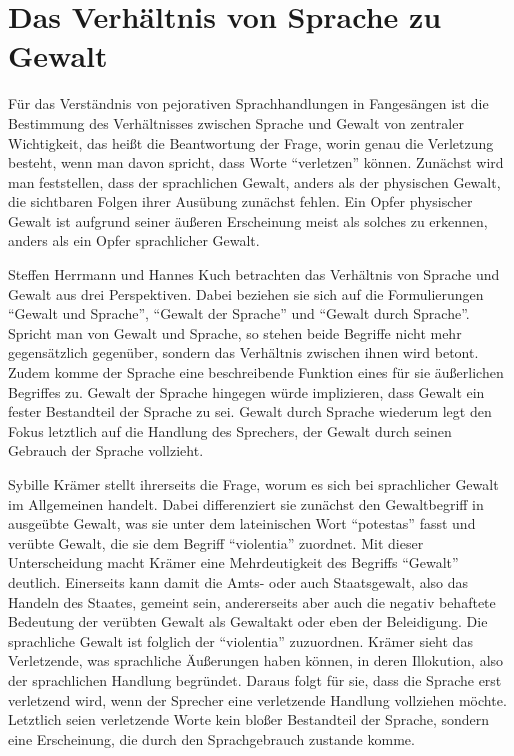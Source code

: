 \section{Das Verhältnis von Sprache zu Gewalt}
Für das Verständnis von pejorativen Sprachhandlungen in Fangesängen ist die Bestimmung des Verhältnisses zwischen Sprache und Gewalt von zentraler Wichtigkeit, das heißt die Beantwortung der Frage, worin genau die Verletzung besteht, wenn man davon spricht, dass Worte "`verletzen"' können.
Zunächst wird man feststellen, dass der sprachlichen Gewalt, anders als der physischen Gewalt, die sichtbaren Folgen ihrer Ausübung zunächst fehlen.
Ein Opfer physischer Gewalt ist aufgrund seiner äußeren Erscheinung meist als solches zu erkennen, anders als ein Opfer sprachlicher Gewalt.

Steffen Herrmann und Hannes Kuch betrachten das Verhältnis von Sprache und Gewalt aus drei Perspektiven\cite[S. 13]{SKH07}.
Dabei beziehen sie sich auf die Formulierungen "`Gewalt und Sprache"', "`Gewalt der Sprache"' und "`Gewalt durch Sprache"'.
Spricht man von Gewalt und Sprache, so stehen beide Begriffe nicht mehr gegensätzlich gegenüber, sondern das Verhältnis zwischen ihnen wird betont.
Zudem komme der Sprache eine beschreibende Funktion eines für sie äußerlichen Begriffes zu.
Gewalt der Sprache hingegen würde implizieren, dass Gewalt ein fester Bestandteil der Sprache zu sei.
Gewalt durch Sprache wiederum legt den Fokus letztlich auf die Handlung des Sprechers, der Gewalt durch seinen Gebrauch der Sprache vollzieht.

Sybille Krämer stellt ihrerseits die Frage, worum es sich bei sprachlicher Gewalt im Allgemeinen handelt.
Dabei differenziert sie zunächst den Gewaltbegriff in ausgeübte Gewalt, was sie unter dem lateinischen Wort "`potestas"' fasst und verübte Gewalt, die sie dem Begriff "`violentia"' zuordnet.
Mit dieser Unterscheidung macht Krämer eine Mehrdeutigkeit des Begriffs "`Gewalt"' deutlich.
Einerseits kann damit die Amts- oder auch Staatsgewalt, also das Handeln des Staates, gemeint sein, andererseits aber auch die negativ behaftete Bedeutung der verübten Gewalt als Gewaltakt oder eben der Beleidigung.
Die sprachliche Gewalt ist folglich der "`violentia"' zuzuordnen.
Krämer sieht das Verletzende, was sprachliche Äußerungen haben können, in deren Illokution, also der sprachlichen Handlung begründet\cite[S. 35]{SK07}.
Daraus folgt für sie, dass die Sprache erst verletzend wird, wenn der Sprecher eine verletzende Handlung vollziehen möchte.
Letztlich seien verletzende Worte kein bloßer Bestandteil der Sprache, sondern eine Erscheinung, die durch den Sprachgebrauch zustande komme.

